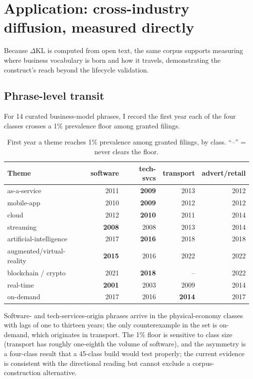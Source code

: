 \documentclass[11pt]{article}
\newcommand{\dkl}{$\Delta$KL}
\begin{document}
\section{Application: cross-industry diffusion, measured directly}\label{sec:diffusion}

Because \dkl{} is computed from open text, the same corpus supports
measuring where business vocabulary is born and how it travels,
demonstrating the construct's reach beyond the lifecycle validation.

\subsection{Phrase-level transit}

For 14 curated business-model phrases, I record the first year each of the
four classes crosses a 1\% prevalence floor among granted filings.

\begin{table}[tbp]\centering\small
\caption{First year a theme reaches 1\% prevalence among granted filings,
by class. ``--'' = never clears the floor.}
\label{tab:transit}
\begin{tabular}{lrrrr}
\toprule
Theme & software & tech-svcs & transport & advert/retail \\
\midrule
as-a-service              & 2011 & \textbf{2009} & 2013 & 2012 \\
mobile-app                & 2010 & \textbf{2009} & 2012 & 2012 \\
cloud                     & 2012 & \textbf{2010} & 2011 & 2014 \\
streaming                 & \textbf{2008} & 2008 & 2013 & 2014 \\
artificial-intelligence   & 2017 & \textbf{2016} & 2018 & 2018 \\
augmented/virtual-reality & \textbf{2015} & 2016 & 2022 & 2022 \\
blockchain / crypto       & 2021 & \textbf{2018} & --   & 2022 \\
real-time                 & \textbf{2001} & 2003 & 2009 & 2014 \\
on-demand                 & 2017 & 2016 & \textbf{2014} & 2017 \\
\bottomrule
\end{tabular}
\end{table}

Software- and tech-services-origin phrases arrive in the physical-economy
classes with lags of one to thirteen years; the only counterexample in the
set is on-demand, which originates in transport. The 1\% floor is sensitive
to class size (transport has roughly one-eighth the volume of software),
and the asymmetry is a four-class result that a 45-class build would test
properly; the current evidence is consistent with the directional reading
but cannot exclude a corpus-construction alternative.
\end{document}
